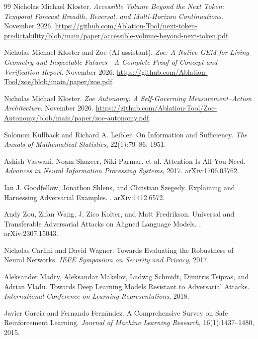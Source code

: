 \begin{thebibliography}{99}
Nicholas Michael Kloster.
\newblock \emph{Accessible Volume Beyond the Next Token: Temporal Forecast Breadth, Reversal, and Multi-Horizon Continuations}.
\newblock November 2026.
\newblock \url{https://github.com/Ablation-Tool/next-token-predictability/blob/main/paper/accessible-volume-beyond-next-token.pdf}.

Nicholas Michael Kloster and Zoe (AI assistant).
\newblock \emph{Zoe: A Native GEM for Living Geometry and Inspectable Futures---A Complete Proof of Concept and Verification Report}.
\newblock November 2026.
\newblock \url{https://github.com/Ablation-Tool/zoe/blob/main/paper/zoe.pdf}.

Nicholas Michael Kloster.
\newblock \emph{Zoe Autonomy: A Self-Governing Measurement--Action Architecture}.
\newblock November 2026.
\newblock \url{https://github.com/Ablation-Tool/Zoe-Autonomy/blob/main/paper/zoe-autonomy.pdf}.

Solomon Kullback and Richard A. Leibler.
\newblock On Information and Sufficiency.
\newblock \emph{The Annals of Mathematical Statistics}, 22(1):79--86, 1951.

Ashish Vaswani, Noam Shazeer, Niki Parmar, et al.
\newblock Attention Is All You Need.
\newblock \emph{Advances in Neural Information Processing Systems}, 2017.
\newblock arXiv:1706.03762.

Ian J. Goodfellow, Jonathon Shlens, and Christian Szegedy.
\newblock Explaining and Harnessing Adversarial Examples.
. arXiv:1412.6572.

Andy Zou, Zifan Wang, J. Zico Kolter, and Matt Fredrikson.
\newblock Universal and Transferable Adversarial Attacks on Aligned Language Models.
. arXiv:2307.15043.

Nicholas Carlini and David Wagner.
\newblock Towards Evaluating the Robustness of Neural Networks.
\newblock \emph{IEEE Symposium on Security and Privacy}, 2017.

Aleksander Madry, Aleksandar Makelov, Ludwig Schmidt, Dimitris Tsipras, and Adrian Vladu.
\newblock Towards Deep Learning Models Resistant to Adversarial Attacks.
\newblock \emph{International Conference on Learning Representations}, 2018.

Javier Garc{\'i}a and Fernando Fern{\'a}ndez.
\newblock A Comprehensive Survey on Safe Reinforcement Learning.
\newblock \emph{Journal of Machine Learning Research}, 16(1):1437--1480, 2015.


\end{thebibliography}
